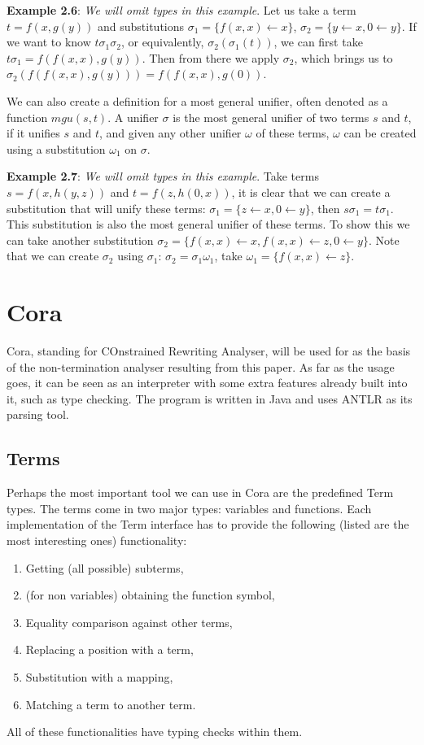 \textbf{Example 2.6}: \textit{We will omit types in this example}. Let us take a term $t = f(x, g(y))$ and substitutions $\sigma_1 = \{ f(x, x) \leftarrow x\}$, $\sigma_2 = \{ y \leftarrow x, 0 \leftarrow y \}$. If we want to know $t\sigma_1\sigma_2$, or equivalently, $\sigma_2(\sigma_1(t))$, we can first take $t\sigma_1 = f(f(x, x), g(y))$. Then from there we apply $\sigma_2$, which brings us to $\sigma_2(f(f(x, x), g(y))) = f(f(x, x), g(0))$.

We can also create a definition for a most general unifier, often denoted as a function $\textit{mgu}(s, t)$. A unifier $\sigma$ is the most general unifier of two terms $s$ and $t$, if it unifies $s$ and $t$, and given any other unifier $\omega$ of these terms, $\omega$ can be created using a substitution $\omega_1$ on $\sigma$.

\textbf{Example 2.7}: \textit{We will omit types in this example}. Take terms $s = f(x, h(y, z))$ and $t = f(z, h(0, x))$, it is clear that we can create a substitution that will unify these terms: $\sigma_1 = \{ z \leftarrow x, 0 \leftarrow y \}$, then $s\sigma_1 = t\sigma_1$. This substitution is also the most general unifier of these terms. To show this we can take another substitution $\sigma_2 = \{ f(x, x) \leftarrow x, f(x, x) \leftarrow z, 0 \leftarrow y \}$. Note that we can create $\sigma_2$ using $\sigma_1$: $\sigma_2 = \sigma_1\omega_1$, take $\omega_1 = \{ f(x, x) \leftarrow z\}$.

\section{Cora}
Cora, standing for COnstrained Rewriting Analyser\cite{Cora2019}, will be used for as the basis of the non-termination analyser resulting from this paper. As far as the usage goes, it can be seen as an interpreter with some extra features already built into it, such as type checking. The program is written in Java and uses ANTLR\cite{Parr:2013:DAR:2501720} as its parsing tool.

\subsection{Terms}
Perhaps the most important tool we can use in Cora are the predefined Term types. The terms come in two major types: variables and functions. Each implementation of the Term interface has to provide the following (listed are the most interesting ones) functionality: 
\begin{enumerate}
    \itemsep0em 
    \item Getting (all possible) subterms,
    \item (for non variables) obtaining the function symbol,
    \item Equality comparison against other terms,
    \item Replacing a position with a term,
    \item Substitution with a mapping,
    \item Matching a term to another term.
\end{enumerate}
All of these functionalities have typing checks within them. 
